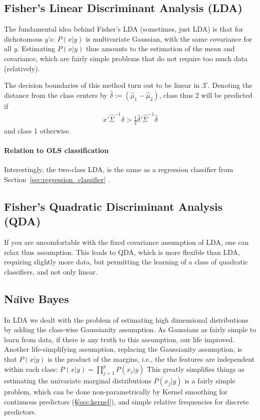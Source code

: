 \documentclass[12pt,a4paper]{article}
\theoremstyle{plain}
\theoremstyle{definition}
\newcommand{\Naive}{Na\"{\i}ve }
\newcommand{\dist}{P}
\newcommand{\featureS}{\mathcal{X}}
\begin{document}
\subsection{Fisher's Linear Discriminant Analysis (LDA)}
\label{sec:lda}
The fundamental idea behind Fisher's LDA (sometimes, just LDA) is that for dichotomous $y$'s: $\dist(x|y)$ is multivariate Gaussian, with the same covariance for all $y$.
Estimating $\dist(x|y)$ thus amounts to the estimation of the mean and covariance, which are fairly simple problems that do not require too much data (relatively).

The decision boundaries of this method turn out to be linear in $\featureS$. 
Denoting the distance from the class centers by $\hat{\delta}:=(\hat{\mu}_1-\hat{\mu}_2)$, class thus 2 will be predicted if 
\begin{align}
	x' \hat{\Sigma}^{-1} \hat{\delta} > \frac{1}{2} \hat{\delta}' \hat{\Sigma}^{-1} \hat{\delta}
\end{align}
and class 1 otherwise.


\paragraph{Relation to OLS classification}
Interestingly, the two-class LDA, is the same as a regression classifier from  Section~\ref{sec:regression_classifier} \cite[Eq. 4.11 ]{hastie_elements_2003}.



\subsection{Fisher's Quadratic Discriminant Analysis (QDA)}
If you are uncomfortable with the fixed covariance assumption of LDA, one can relax thus assumption.
This leads to QDA, which is more flexible than LDA, requiring slightly more data, but permitting the learning of a class of quadratic classifiers, and not only linear.






\subsection{\Naive Bayes}
\label{sec:naive_bayes}
In LDA we dealt with the problem of estimating high dimensional distributions by adding the class-wise Gaussianity assumption. As Gaussians as fairly simple to learn from data, if there is any truth to this assumption, our life improved. 
Another life-simplifying assumption, replacing the Gaussianity assumption, is that $\dist(x|y)$ is the product of the margins, i.e., the the features are independent within each class: $\dist(x|y)=\prod_{j=1}^p\dist(x_j|y)$
This greatly simplifies things as estimating the univariate marginal distributions $\dist(x_j|y)$ is a fairly simple problem, which can be done non-parametrically by Kernel smoothing for continuous predictors (\S\ref{sec:kernel}), and simple relative frequencies for discrete predictors. 
\end{document}
